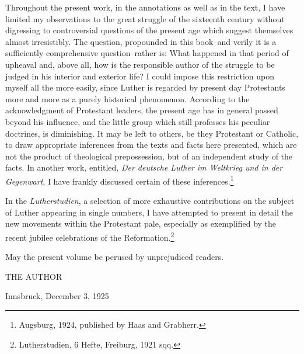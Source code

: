 Throughout the present work, in the annotations as well as in the text,
I have limited my observations to the great struggle of the sixteenth century
without digressing to controversial questions of the
present age which suggest themselves almost irresistibly. The question,
propounded in this book--and verily it is a sufficiently comprehensive question--rather is:
What happened in that period of upheaval
and, above all, how is the responsible author of the struggle to be
judged in his interior and exterior life? I could impose this restriction
upon myself all the more easily, since Luther is regarded by present day
Protestants more and more as a purely historical phenomenon.
According to the acknowledgment of Protestant leaders, the present
age has in general passed beyond his influence, and the little group
which still professes his peculiar doctrines, is diminishing. It may be
left to others, be they Protestant or Catholic, to draw appropriate inferences from the texts and facts here presented, which are not the
product of theological prepossession, but of an independent study of
the facts. In another work, entitled, \textit{Der deutsche Luther im Weltkrieg und in der Gegenwart}, I have frankly discussed certain of these inferences.\footnote{Augsburg, 1924, published by Haas and Grabherr.}

In the \textit{Lutherstudien}, a selection of more exhaustive contributions on the subject of Luther appearing in single numbers, I have attempted to present in detail the new movements within the Protestant pale, especially as exemplified by the recent jubilee celebrations of
the Reformation.\footnote{Lutherstudien, 6 Hefte, Freiburg, 1921 sqq.}

May the present volume be perused by unprejudiced readers.

\hfill THE AUTHOR

\begin{flushleft}
Innsbruck, December 3, 1925
\end{flushleft}
